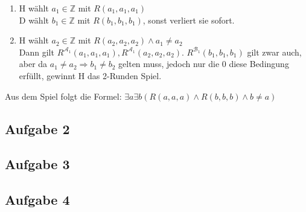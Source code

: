 \documentclass[a4paper,10pt]{article}
\newcommand{\Z}{\mathbb{Z}}
\begin{document}
\begin{enumerate}[(i)]
\begin{enumerate}[1. \text{Zug:}]
			\item  	H wählt $a_1 \in \mathbb{Z}$ mit $R(a_1,a_1,a_1)$ \\
				D wählt $b_1 \in \Z$ mit $R(b_1,b_1,b_1) $, sonst verliert sie sofort.
			\item  	H wählt $a_2 \in \mathbb{Z}$ mit $R(a_2,a_2,a_2) \land a_1 \neq a_2$ \\
			Dann gilt $R^{\mathcal{A}_1}(a_1,a_1,a_1), R^{\mathcal{A}_1}(a_2,a_2,a_2)$. $R^{\mathcal{B}_1}(b_1,b_1,b_1)$ gilt zwar auch, aber da $a_1 \neq a_2 \Rightarrow b_1 \neq b_2$ gelten muss, jedoch nur die $0$ diese Bedingung erfüllt, gewinnt H das 2-Runden Spiel.
			
		\end{enumerate}
	Aus dem Spiel folgt die Formel: $\exists a \exists b(R(a,a,a) \land R(b,b,b) \land b \neq a)$

\end{enumerate}
\subsection*{Aufgabe 2}

\subsection*{Aufgabe 3}

\subsection*{Aufgabe 4}
\end{document}
